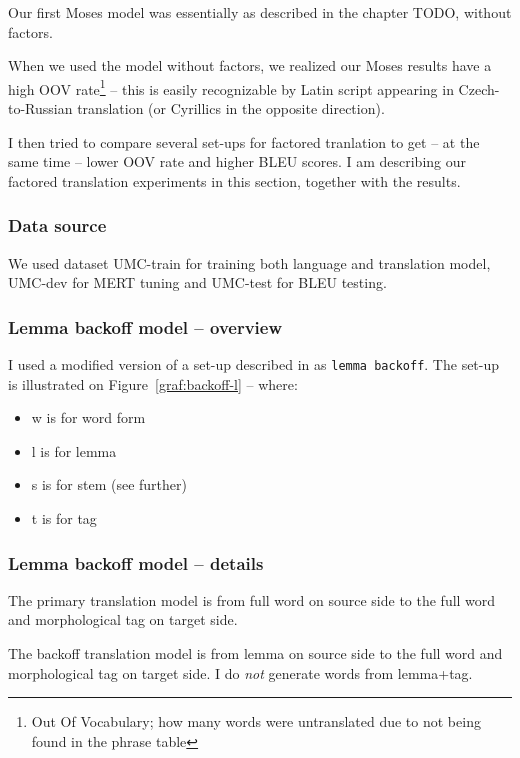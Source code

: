 Our first Moses model was essentially as described in the chapter TODO, without factors.

When we used the model without factors, we realized our Moses results have a high OOV rate\footnote{Out Of Vocabulary; how many words were untranslated due to not being found in the phrase table} -- this is easily recognizable by Latin script appearing in Czech-to-Russian translation (or Cyrillics in the opposite direction). 

I then tried to compare several set-ups for factored tranlation to get -- at the same time -- lower OOV rate and higher BLEU scores. I am describing our factored translation experiments in this section, together with the results.

\subsubsection{Data source}
We used dataset UMC-train for training both language and translation model, UMC-dev for MERT tuning and UMC-test for BLEU testing.

\subsubsection{Lemma backoff model -- overview}


I used a modified version of a set-up described in \cite{backoff} as \texttt{lemma backoff}. The set-up is illustrated on Figure~\ref{graf:backoff-l} -- where: 
\begin{itemize}
\item w is for word form
\item l is for lemma
\item s is for stem (see further)
\item t is for tag
\end{itemize}

\subsubsection{Lemma backoff model -- details}

The primary translation model is from full word on source side to the full word and morphological tag on target side. 

The backoff translation model is from lemma on source side to the full word and morphological tag on target side. I do \emph{not} generate words from lemma+tag.

